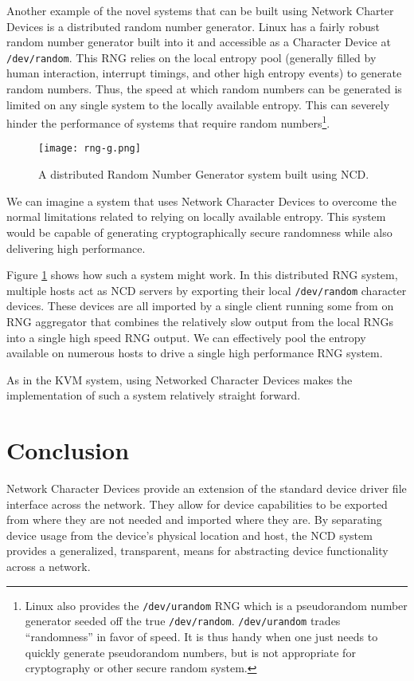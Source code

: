 \documentclass[11pt,twocolumn]{article}
\begin{document}
Another example of the novel systems that can be built using Network
Charter Devices is a distributed random number generator. Linux has a
fairly robust random number generator built into it and accessible as
a Character Device at \texttt{/dev/random}. This RNG relies on the
local entropy pool (generally filled by human interaction, interrupt
timings, and other high entropy events) to generate random
numbers. Thus, the speed at which random numbers can be generated is
limited on any single system to the locally available
entropy. This can severely hinder the
performance of systems that require random numbers\footnote{Linux also
provides the \texttt{/dev/urandom} RNG which is a pseudorandom number
generator seeded off the true
\texttt{/dev/random}. \texttt{/dev/urandom} trades ``randomness'' in
favor of speed. It is thus handy when one just needs to quickly
generate pseudorandom numbers, but is not appropriate for cryptography or
other secure random system.}.

\begin{figure}[h]
  \centering
  \texttt{[image: rng-g.png]}
  \caption{A distributed Random Number Generator system built using NCD.}
  \label{fig:rng}
\end{figure}

We can imagine a system that uses Network Character Devices to overcome
the normal limitations related to relying on locally available entropy. This
system would be capable of generating cryptographically secure
randomness while also delivering high performance.

Figure \ref{fig:rng} shows how such a system might work. In this
distributed RNG system, multiple hosts act as NCD servers by exporting
their local \texttt{/dev/random} character devices. These devices are
all imported by a single client running some from on RNG aggregator
that combines the relatively slow output from the local RNGs into a
single high speed RNG output. We can effectively pool the entropy
available on numerous hosts to drive a single high performance RNG
system.

As in the KVM system, using Networked Character Devices makes the
implementation of such a system relatively straight forward.

\section{Conclusion}
\label{sec:conclusion}

Network Character Devices provide an extension of the standard device
driver file interface across the network. They allow for device
capabilities to be exported from where they are not needed and imported
where they are. By separating device usage from the device's physical
location and host, the NCD system provides a generalized, transparent,
means for abstracting device functionality across a network.
\end{document}
